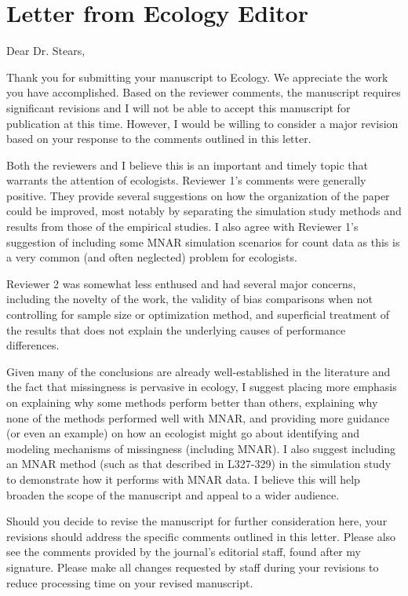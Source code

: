 \documentclass{article}
\begin{document}
\section{Letter from Ecology Editor}

Dear Dr. Stears,

Thank you for submitting your manuscript to Ecology. We appreciate the work you have accomplished. Based on the reviewer comments, the manuscript requires significant revisions and I will not be able to accept this manuscript for publication at this time. However, I would be willing to consider a major revision based on your response to the comments outlined in this letter.

Both the reviewers and I believe this is an important and timely topic that warrants the attention of ecologists. Reviewer 1’s comments were generally positive. They provide several suggestions on how the organization of the paper could be improved, most notably by separating the simulation study methods and results from those of the empirical studies. I also agree with Reviewer 1’s suggestion of including some MNAR simulation scenarios for count data as this is a very common (and often neglected) problem for ecologists.

Reviewer 2 was somewhat less enthused and had several major concerns, including the novelty of the work, the validity of bias comparisons when not controlling for sample size or optimization method, and superficial treatment of the results that does not explain the underlying causes of performance differences.

Given many of the conclusions are already well-established in the literature and the fact that missingness is pervasive in ecology, I suggest placing more emphasis on explaining why some methods perform better than others, explaining why none of the methods performed well with MNAR, and providing more guidance (or even an example) on how an ecologist might go about identifying and modeling mechanisms of missingness (including MNAR). I also suggest including an MNAR method (such as that described in L327-329) in the simulation study to demonstrate how it performs with MNAR data. I believe this will help broaden the scope of the manuscript and appeal to a wider audience.

Should you decide to revise the manuscript for further consideration here, your revisions should address the specific comments outlined in this letter. Please also see the comments provided by the journal's editorial staff, found after my signature. Please make all changes requested by staff during your revisions to reduce processing time on your revised manuscript.
\end{document}
